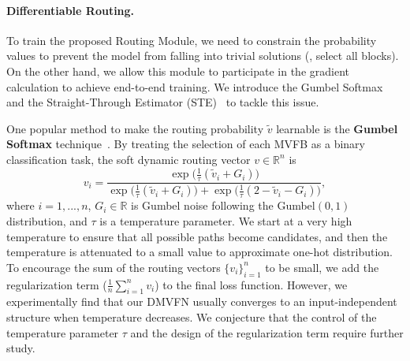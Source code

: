 \documentclass[10pt,twocolumn,letterpaper]{article}
\begin{document}
\paragraph{Differentiable Routing.} To train the proposed Routing Module, we need to constrain the probability values to prevent the model from falling into trivial solutions (\eg, select all blocks). On the other hand, we allow this module to participate in the gradient calculation to achieve end-to-end training. We introduce the Gumbel Softmax~\cite{gumbel} and the Straight-Through Estimator (STE)~\cite{bengio2013estimating} to tackle this issue.

One popular method to make the routing probability $\tilde{v}$ learnable is the \textbf{Gumbel Softmax} technique~\cite{gumbel,channel}. By treating the selection of each MVFB as a binary classification task, the soft dynamic routing vector $v\in\mathbb{R}^{n}$ is
\begin{equation}
v_i = \frac{\exp\big (\frac{1}{\tau}(\tilde{v}_{i} + G_{i})\big )}{\exp\big (\frac{1}{\tau}( \tilde{v}_{i} + G_{i})                   \big )+\exp\big (\frac{1}{\tau}(2-\tilde{v}_{i}-G_{i})\big )},
\end{equation}
where $i=1,...,n$, $G_{i}\in\mathbb{R}$ is Gumbel noise following the Gumbel$(0,1)$ distribution, and $\tau$ is a temperature parameter. We start at a very high temperature to ensure that all possible paths become candidates, and then the temperature is attenuated to a small value to approximate one-hot distribution. To encourage the sum of the routing vectors $\{v_{i}\}_{i=1}^{n}$ to be small, we add the regularization term ($\frac{1}{n}\sum^{n}_{i=1}v_i$) to the final loss function. However, we experimentally find that our DMVFN usually converges to an input-independent structure when temperature decreases. We conjecture that the control of the temperature parameter $\tau$ and the design of the regularization term require further study.
\end{document}
